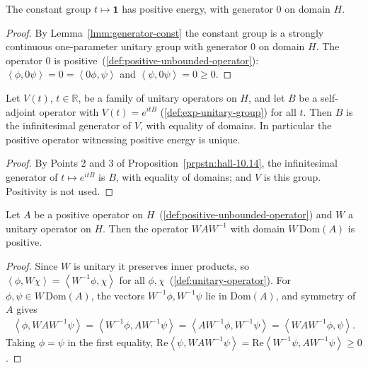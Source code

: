 \begin{lemma}
    \label{lmm:positive-energy-const}
    \leanok
    The constant group $t \mapsto \mathbf{1}$ has positive energy, with generator $0$ on domain $H$.
\end{lemma}
\begin{proof}
    \leanok
    By Lemma~\ref{lmm:generator-const} the constant group is a strongly continuous one-parameter unitary group with generator $0$ on domain $H$. The operator $0$ is positive~(\ref{def:positive-unbounded-operator}): $\left< \phi, 0\psi \right> = 0 = \left< 0\phi, \psi \right>$ and $\left< \psi, 0\psi \right> = 0 \ge 0$.
\end{proof}

\begin{lemma}
    \label{lmm:exp-generator-unique}
    \leanok
    Let $V(t)$, $t \in \mathbb{R}$, be a family of unitary operators on $H$, and let $B$ be a self-adjoint operator with $V(t) = e^{itB}$ (\ref{def:exp-unitary-group}) for all $t$. Then $B$ is the infinitesimal generator of $V$, with equality of domains. In particular the positive operator witnessing positive energy is unique.
\end{lemma}
\begin{proof}
    \leanok
    By Points 2 and 3 of Proposition~\ref{prpstn:hall-10.14}, the infinitesimal generator of $t \mapsto e^{itB}$ is $B$, with equality of domains; and $V$ is this group. Positivity is not used.
\end{proof}

\begin{lemma}
    \label{lmm:positive-conj}
    \leanok
    Let $A$ be a positive operator on $H$~(\ref{def:positive-unbounded-operator}) and $W$ a unitary operator on $H$. Then the operator $WAW^{-1}$ with domain $W\,\text{Dom}(A)$ is positive.
\end{lemma}
\begin{proof}
    \leanok
    Since $W$ is unitary it preserves inner products, so $\left< \phi, W\chi \right> = \left< W^{-1}\phi, \chi \right>$ for all $\phi, \chi$~(\ref{def:unitary-operator}). For $\phi, \psi \in W\,\text{Dom}(A)$, the vectors $W^{-1}\phi, W^{-1}\psi$ lie in $\text{Dom}(A)$, and symmetry of $A$ gives
    \begin{align}
        \left< \phi, WAW^{-1}\psi \right> = \left< W^{-1}\phi, AW^{-1}\psi \right> = \left< AW^{-1}\phi, W^{-1}\psi \right> = \left< WAW^{-1}\phi, \psi \right>.
    \end{align}
    Taking $\phi = \psi$ in the first equality, $\text{Re}\left< \psi, WAW^{-1}\psi \right> = \text{Re}\left< W^{-1}\psi, AW^{-1}\psi \right> \ge 0$.
\end{proof}

